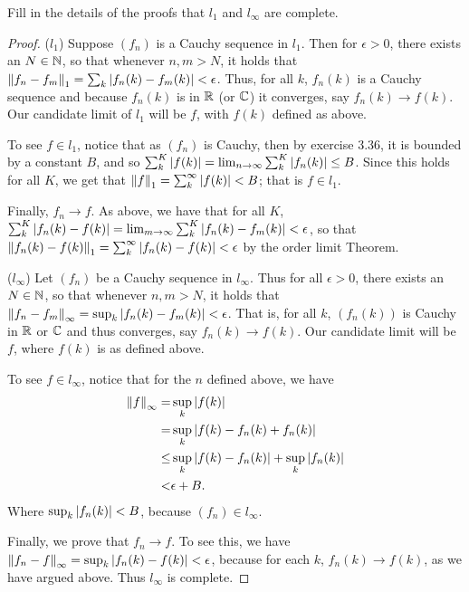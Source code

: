\begin{exercise}{18}
Fill in the details of the proofs that $l_1$ and $l_\infty$ are complete.
\end{exercise}
\begin{proof}
($l_1$)
Suppose $(f_n)$ is a Cauchy sequence in $l_1$.
Then for $\epsilon>0$, there exists an $N\in\mathbb{N}$, so that whenever $n,m>N$, it holds that $\left\lVert f_n-f_m\right\rVert_1 = \sum_k \left\lvert f_n(k)-f_m(k)\right\rvert < \epsilon$.
Thus, for all $k$, $f_n(k)$ is a Cauchy sequence and because $f_n(k)$ is in $\mathbb{R}$ (or $\mathbb{C}$) it converges, say $f_n(k)\to f(k)$. 
Our candidate limit of $l_1$ will be $f$, with $f(k)$ defined as above.

To see $f\in l_1$, notice that as $(f_n)$ is Cauchy, then by exercise 3.36, it is bounded by a constant $B$, and so $\sum_k^K \left\lvert f(k)\right\rvert = \lim_{n\to\infty} \sum_k^K \left\lvert f_n(k)\right\rvert \leq B$.
Since this holds for all $K$, we get that $\left\lVert f\right\rVert_1 = \sum_k^\infty \left\lvert f(k)\right\rvert < B$;
that is $f\in l_1$.

Finally, $f_n\to f$.
As above, we have that for all $K$, $\sum_k^K \left\lvert f_n(k)-f(k)\right\rvert = \lim_{m\to \infty} \sum_k^K \left\lvert f_n(k)-f_m(k)\right\rvert < \epsilon$, so that $\left\lVert f_n(k)-f(k)\right\rVert_1 = \sum_k^\infty \left\lvert f_n(k)-f(k)\right\rvert < \epsilon$ by the order limit Theorem.

($l_\infty$)
Let $(f_n)$ be a Cauchy sequence in $l_\infty$.
Thus for all $\epsilon>0$, there exists an $N\in\mathbb{N}$, so that whenever $n,m>N$, it holds that $\left\lVert f_n-f_m\right\rVert_\infty = \sup_k\left\lvert f_n(k)-f_m(k)\right\rvert < \epsilon$.
That is, for all $k$, $(f_n(k))$ is Cauchy  in $\mathbb{R}$ or $\mathbb{C}$ and thus converges, say $f_n(k)\to f(k)$.
Our candidate limit will be $f$, where $f(k)$ is as defined above.

To see $f\in l_\infty$, notice that for the $n$ defined above, we have 
\begin{align*}
    \left\lVert f\right\rVert_\infty 
    =& \sup_k \left\lvert f(k)\right\rvert\\ 
    =& \sup_k \left\lvert f(k) - f_n(k) + f_n(k)\right\rvert\\
    \leq& \sup_k\left\lvert f(k) - f_n(k)\right\rvert + \sup_k\left\lvert f_n(k)\right\rvert\\
    <& \epsilon + B.
\end{align*}
Where $\sup_k\left\lvert f_n(k)\right\rvert<B$, because $(f_n)\in l_\infty$.

Finally, we prove that $f_n\to f$.
To see this, we have $\left\lVert f_n-f\right\rVert_\infty = \sup_k \left\lvert f_n(k) - f(k)\right\rvert < \epsilon$, because for each $k$, $f_n(k)\to f(k)$, as we have argued above.
Thus $l_\infty$ is complete. 
\end{proof} 

